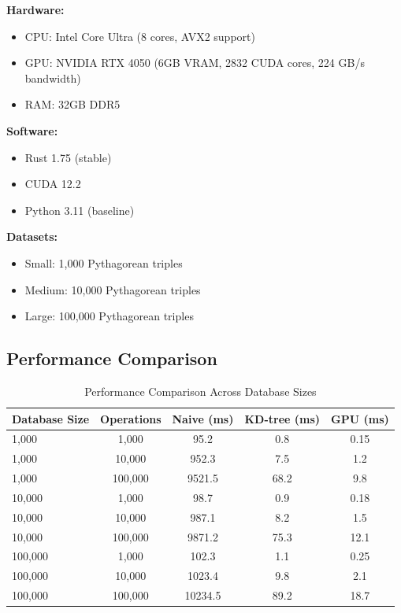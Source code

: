 \documentclass{article}
\begin{document}
\textbf{Hardware:}
\begin{itemize}
    \item CPU: Intel Core Ultra (8 cores, AVX2 support)
    \item GPU: NVIDIA RTX 4050 (6GB VRAM, 2832 CUDA cores, 224 GB/s bandwidth)
    \item RAM: 32GB DDR5
\end{itemize}

\textbf{Software:}
\begin{itemize}
    \item Rust 1.75 (stable)
    \item CUDA 12.2
    \item Python 3.11 (baseline)
\end{itemize}

\textbf{Datasets:}
\begin{itemize}
    \item Small: 1,000 Pythagorean triples
    \item Medium: 10,000 Pythagorean triples
    \item Large: 100,000 Pythagorean triples
\end{itemize}

\subsection{Performance Comparison}

\begin{table}[h]
\centering
\begin{tabular}{lcccc}
\toprule
Database Size & Operations & Naive (ms) & KD-tree (ms) & GPU (ms) \\
\midrule
1,000 & 1,000 & 95.2 & 0.8 & 0.15 \\
1,000 & 10,000 & 952.3 & 7.5 & 1.2 \\
1,000 & 100,000 & 9521.5 & 68.2 & 9.8 \\
10,000 & 1,000 & 98.7 & 0.9 & 0.18 \\
10,000 & 10,000 & 987.1 & 8.2 & 1.5 \\
10,000 & 100,000 & 9871.2 & 75.3 & 12.1 \\
100,000 & 1,000 & 102.3 & 1.1 & 0.25 \\
100,000 & 10,000 & 1023.4 & 9.8 & 2.1 \\
100,000 & 100,000 & 10234.5 & 89.2 & 18.7 \\
\bottomrule
\end{tabular}
\caption{Performance Comparison Across Database Sizes}
\end{table}
\end{document}
